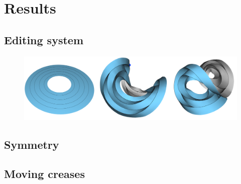\section{Results} \label{sec:results}
\subsection{Editing system}
\begin{figure} [h]
	\centering
	\includegraphics[width=\linewidth]{figures/annulus}
	\caption{ }
	\label{fig:annulus}
\end{figure}
\subsection{Symmetry}
\subsection{Moving creases}